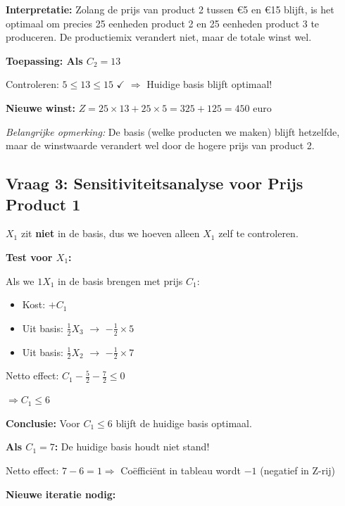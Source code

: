 \documentclass[a4paper,11pt]{article}
\begin{document}
\begin{oefenblok}
    \textbf{Interpretatie:} Zolang de prijs van product 2 tussen €5 en €15 blijft, is het optimaal om precies 25 eenheden product 2 en 25 eenheden product 3 te produceren. De productiemix verandert niet, maar de totale winst wel.

    \vspace{0.3cm}

    \textbf{Toepassing: Als $C_2 = 13$}

    Controleren: $5 \leq 13 \leq 15$ $\checkmark$ $\Rightarrow$ Huidige basis blijft optimaal!

    \textbf{Nieuwe winst:} $Z = 25 \times 13 + 25 \times 5 = 325 + 125 = 450$ euro

    \textit{Belangrijke opmerking:} De basis (welke producten we maken) blijft hetzelfde, maar de winstwaarde verandert wel door de hogere prijs van product 2.

    \subsection*{Vraag 3: Sensitiviteitsanalyse voor Prijs Product 1}

    $X_1$ zit \textbf{niet} in de basis, dus we hoeven alleen $X_1$ zelf te controleren.

    \textbf{Test voor $X_1$:}

    Als we $1 X_1$ in de basis brengen met prijs $C_1$:
    \begin{itemize}
        \item Kost: $+C_1$
        \item Uit basis: $\frac{1}{2} X_3$ $\rightarrow$ $-\frac{1}{2} \times 5$
        \item Uit basis: $\frac{1}{2} X_2$ $\rightarrow$ $-\frac{1}{2} \times 7$
    \end{itemize}

    Netto effect: $C_1 - \frac{5}{2} - \frac{7}{2} \leq 0$

    $\Rightarrow C_1 \leq 6$

    \textbf{Conclusie:} Voor $C_1 \leq 6$ blijft de huidige basis optimaal.

    \textbf{Als $C_1 = 7$:} De huidige basis houdt niet stand!

    Netto effect: $7 - 6 = 1 \Rightarrow$ Coëfficiënt in tableau wordt $-1$ (negatief in Z-rij)

    \textbf{Nieuwe iteratie nodig:}


\end{oefenblok}
\end{document}
